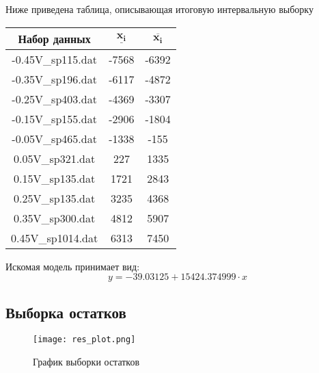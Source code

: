 \documentclass[12pt,a4paper]{article}
\begin{document}
                Ниже приведена таблица, описывающая итоговую интервальную выборку
                \begin{center}
                    \begin{tabular}{|c|c|c|}
                    \hline
                        \textbf{Набор данных} & $\mathbf{\underline{x_i}}$ & $\mathbf{\overline{x_i}}$\\
                        \hline
                        -0.45V\_sp115.dat&-7568&-6392\\
                        \hline
                        -0.35V\_sp196.dat&-6117&-4872\\
                        \hline
                        -0.25V\_sp403.dat&-4369&-3307\\
                        \hline
                        -0.15V\_sp155.dat&-2906&-1804\\
                        \hline
                        -0.05V\_sp465.dat&-1338&-155\\
                        \hline
                        0.05V\_sp321.dat&227&1335\\
                        \hline
                        0.15V\_sp135.dat&1721&2843\\
                        \hline
                        0.25V\_sp135.dat&3235&4368\\
                        \hline
                        0.35V\_sp300.dat&4812&5907\\
                        \hline
                        0.45V\_sp1014.dat&6313&7450\\
                        \hline
                    \end{tabular}
                \end{center}
                Искомая модель принимает вид:
                \begin{equation}
                    y = -39.03125 + 15424.374999 \cdot x
                \end{equation}
            
            \subsection{Выборка остатков}
                \begin{figure}[h!]
                    \centering
                    \texttt{[image: res\_plot.png]}
                    \caption{График выборки остатков}
                \end{figure}
                \FloatBarrier
                
\end{document}
